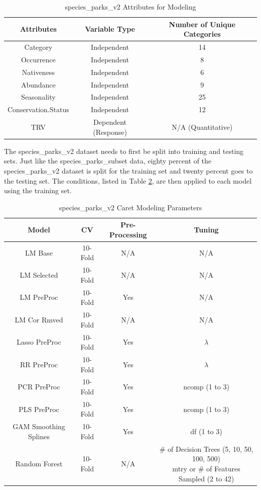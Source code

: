 \documentclass[stu, floatsintext, 11pt]{apa7}
\begin{document}
\begin{table}[h!]
    \centering
    \caption{species\_parks\_v2 Attributes for Modeling}
    \begin{tabular}{c c c}
    \hline
    \textbf{Attributes} & \textbf{Variable Type} & \textbf{Number of Unique Categories} \\
    \hline
    Category &  Independent &  14 \\
    Occurrence &  Independent & 8 \\
    Nativeness & Independent & 6 \\
    Abundance & Independent & 9 \\
    Seasonality & Independent & 25 \\
    Conservation.Status & Independent & 12 \\
    TRV & Dependent (Response) & N/A (Quantitative) \\
    \hline
    \end{tabular}
    \label{tab:species_parks_v2}
\end{table}

The species\_parks\_v2 dataset needs to first be split into training and testing sets. Just like the species\_parks\_subset data, eighty percent of the species\_parks\_v2 dataset is split for the training set and twenty percent goes to the testing set. The conditions, listed in Table \ref{tab:v2_caret}, are then applied to each model using the training set.

\begin{table}[h!]
    \centering
    \caption{species\_parks\_v2 Caret Modeling Parameters}
    \begin{tabular}{c c c c}
    \hline
    \textbf{Model} & \textbf{CV} & \textbf{Pre-Processing}  & \textbf{Tuning} \\
    \hline
    LM Base & 10-Fold & N/A & N/A \\
    LM Selected &  10-Fold & N/A & N/A \\
    LM PreProc & 10-Fold & Yes & N/A \\
    LM Cor Rmved & 10-Fold & N/A & N/A \\
    Lasso PreProc & 10-Fold & Yes & $\lambda$ \\
    RR PreProc & 10-Fold & Yes & $\lambda$ \\
    PCR PreProc & 10-Fold & Yes & ncomp (1 to 3) \\
    PLS PreProc & 10-Fold & Yes & ncomp (1 to 3) \\
    GAM Smoothing Splines & 10-Fold & Yes & df (1 to 3) \\
    Random Forest & 10-Fold & N/A & \makecell{\# of Decision Trees (5, 10, 50, 100, 500) \\ mtry or \# of Features Sampled (2 to 42)}\\
    \hline
    \end{tabular}
    \label{tab:v2_caret}
\end{table}
\end{document}
